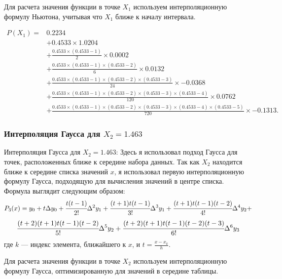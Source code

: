 \documentclass{article}
\begin{document}
                  Для расчета значения функции в точке $X_1$ используем интерполяционную формулу Ньютона, учитывая что $X_1$ ближе к началу интервала.
 
                  \[
                  \begin{aligned}
                  P(X_1) = & 0.2234 \\
                        & + 0.4533 \times 1.0204 \\
                        & + \frac{0.4533 \times (0.4533-1)}{2} \times 0.0002 \\
                        & + \frac{0.4533 \times (0.4533-1) \times (0.4533-2)}{6} \times 0.0132 \\
                        & + \frac{0.4533 \times (0.4533-1) \times (0.4533-2) \times (0.4533-3)}{24} \times -0.0368 \\
                        & + \frac{0.4533 \times (0.4533-1) \times (0.4533-2) \times (0.4533-3) \times (0.4533-4)}{120} \times 0.0762 \\
                        & + \frac{0.4533 \times (0.4533-1) \times (0.4533-2) \times (0.4533-3) \times (0.4533-4) \times (0.4533-5)}{720} \times -0.1313.
                  \end{aligned}
                  \]

            \subsubsection{Интерполяция Гаусса для \( X_2 = 1.463 \)}
            
                  Интерполяция Гаусса для \( X_2 = 1.463 \): Здесь я использовал подход Гаусса для точек, расположенных ближе к середине набора данных. Так как \( X_2 \) находится ближе к середине списка значений \( x \), я использовал первую интерполяционную формулу Гаусса, подходящую для вычисления значений в центре списка. Формула выглядит следующим образом:
                  $$P_3(x) = y_0 + t\Delta y_0 + \cfrac{t(t-1)}{2!}\Delta^2 y_1 + 
                  \cfrac{(t+1)t(t-1)}{3!}\Delta^3 y_1 + 
                  \cfrac{(t+1)t(t-1)(t-2)}{4!}\Delta^4 y_2 + $$
                  $$\cfrac{(t+2)(t+1)t(t-1)(t-2)}{5!}\Delta^5 y_2 + 
                  \cfrac{(t+2)(t+1)t(t-1)(t-2)(t-3)}{6!}\Delta^6 y_3 $$
                  где \( k \) — индекс элемента, ближайшего к \( x \), и \( t = \frac{x - x_k}{h} \).

                  Для расчета значения функции в точке \( X_2 \) используем интерполяционную формулу Гаусса, оптимизированную для значений в середине таблицы.
\end{document}
